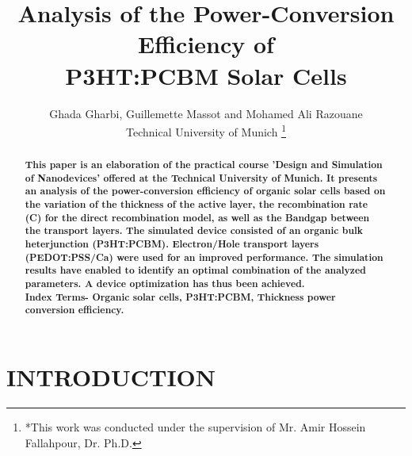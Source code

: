 \documentclass[letterpaper, 10 pt, conference]{ieeeconf}
\title{\LARGE \bf
Analysis of the Power-Conversion Efficiency of \\ P3HT:PCBM Solar Cells
}
\author{Ghada Gharbi, Guillemette Massot and Mohamed Ali Razouane \\ Technical University of Munich%
\thanks{*This work was conducted under the supervision of Mr. Amir Hossein Fallahpour, Dr. Ph.D.}%
%
}
\begin{document}
\maketitle
\thispagestyle{empty}
\pagestyle{empty}

\begin{abstract}
\textbf{This paper is an elaboration of the practical course 'Design and Simulation of Nanodevices' offered at the Technical University of Munich. It presents an analysis of the power-conversion efficiency of organic solar cells based on the variation of the thickness of the active layer, the recombination rate (C) for the direct recombination model, as well as the Bandgap between the transport layers. The simulated device consisted of an organic bulk heterjunction (P3HT:PCBM). Electron/Hole transport layers (PEDOT:PSS/Ca) were used for an improved performance. The simulation results have enabled to identify an optimal combination of the analyzed parameters. A device optimization has thus been achieved.}\\

\textbf{Index Terms- Organic solar cells, P3HT:PCBM, Thickness  power conversion efficiency.}

\end{abstract}


\section{INTRODUCTION}
\end{document}
